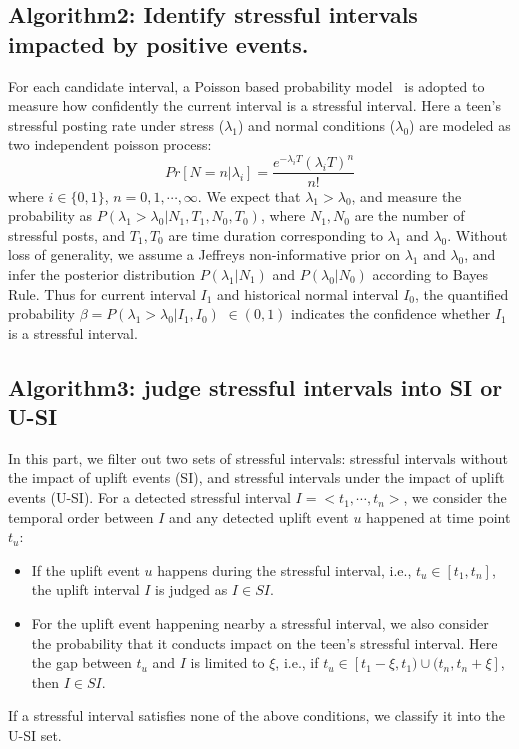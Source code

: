 \subsection{Algorithm2: Identify stressful intervals impacted by positive events.}
\label{alg:alg2}
For each candidate interval,
a Poisson based probability model~\cite{Li2017Analyzing} is adopted to measure how confidently the current interval is a stressful interval.
Here a teen's stressful posting rate under stress ($\lambda_1$) and normal conditions ($\lambda_0$) are modeled as two independent poisson process:
\begin{equation}
Pr[N=n|\lambda_i]=\frac{e^{-\lambda_i T}{(\lambda_i T)}^n}{n!}
\end{equation}
where $i\in\{0,1\}$, $n=0,1,\cdots,\infty$.
We expect that $\lambda_1 > \lambda_0$, and measure the probability as $P(\lambda_1>\lambda_0|N_1, T_1, N_0, T_0)$,
where $N_1, N_0$ are the number of stressful posts, and $T_1, T_0$ are time duration corresponding to $\lambda_1$ and $\lambda_0$.
Without loss of generality, we assume a Jeffreys non-informative prior on $\lambda_1$ and $\lambda_0$,
and infer the posterior distribution $P(\lambda_1|N_1)$ and $P(\lambda_0|N_0)$ according to Bayes Rule.
Thus for current interval $I_1$ and historical normal interval $I_0$,
the quantified probability $\beta = P(\lambda_1>\lambda_0|I_1,I_0)$ $\in (0,1)$ indicates the confidence whether $I_1$ is a stressful interval.


\subsection{Algorithm3: judge stressful intervals into SI or U-SI}
\label{alg:alg3}
In this part, we filter out two sets of stressful intervals: stressful intervals without the impact of uplift events (SI),
and stressful intervals under the impact of uplift events (U-SI).
For a detected stressful interval $I = <t_1,\cdots,t_n>$, we consider the temporal order between $I$ and any detected uplift event $u$ happened at time point $t_u$:
\begin{itemize}
\item If the uplift event $u$ happens during the stressful interval, i.e., $t_u \in [t_1,t_n]$, the uplift interval $I$ is judged as $I \in SI$.
\item For the uplift event happening nearby a stressful interval,
we also consider the probability that it conducts impact on the teen's stressful interval.
Here the gap between $t_u$ and $I$ is limited to $\xi$, i.e.,
if $t_u \in [t_{1}-\xi, t_1)\cup(t_{n},t_{n}+\xi]$, then $I \in SI$.
\end{itemize}
If a stressful interval satisfies none of the above conditions, we classify it into the U-SI set.

